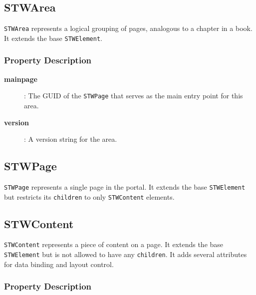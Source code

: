\subsection{STWArea}

\texttt{STWArea} represents a logical grouping of pages, analogous to a chapter in a book. It extends the base \texttt{STWElement}.

\subsubsection{Property Description}

\begin{description}
\item[\textbf{mainpage}]: The GUID of the \texttt{STWPage} that serves as the main entry point for this area.
\item[\textbf{version}]: A version string for the area.
\end{description}

\subsection{STWPage}

\texttt{STWPage} represents a single page in the portal. It extends the base \texttt{STWElement} but restricts its \texttt{children} to only \texttt{STWContent} elements.

\subsection{STWContent}

\texttt{STWContent} represents a piece of content on a page. It extends the base \texttt{STWElement} but is not allowed to have any \texttt{children}. It adds several attributes for data binding and layout control.

\subsubsection{Property Description}

